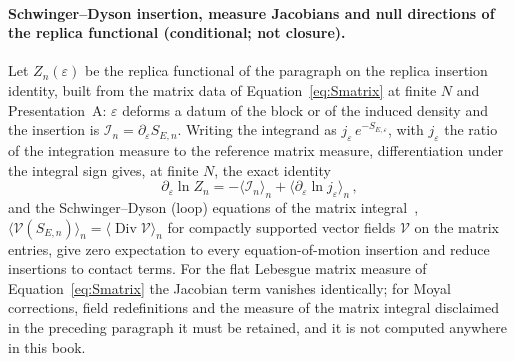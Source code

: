 \paragraph{Schwinger--Dyson insertion, measure Jacobians and null directions of the replica functional (conditional; not closure).}
Let \(Z_n(\varepsilon)\) be the replica functional of the paragraph on the replica insertion identity, built from the matrix data of Equation~\eqref{eq:Smatrix} at finite \(N\) and Presentation~A: \(\varepsilon\) deforms a datum of the block or of the induced density and the insertion is \(\mathcal I_n=\partial_\varepsilon S_{E,n}\). Writing the integrand as \(j_\varepsilon\,e^{-S_{E,\varepsilon}}\), with \(j_\varepsilon\) the ratio of the integration measure to the reference matrix measure, differentiation under the integral sign gives, at finite \(N\), the exact identity
\[
  \partial_\varepsilon\ln Z_n=-\langle\mathcal I_n\rangle_n+\langle\partial_\varepsilon\ln j_\varepsilon\rangle_n\,,
\]
and the Schwinger--Dyson (loop) equations of the matrix integral~\cite{EynardOrantin2009}, \(\langle\mathcal V(S_{E,n})\rangle_n=\langle\operatorname{Div}\mathcal V\rangle_n\) for compactly supported vector fields \(\mathcal V\) on the matrix entries, give zero expectation to every equation-of-motion insertion and reduce insertions to contact terms. For the flat Lebesgue matrix measure of Equation~\eqref{eq:Smatrix} the Jacobian term vanishes identically; for Moyal corrections, field redefinitions and the measure of the matrix integral disclaimed in the preceding paragraph it must be retained, and it is not computed anywhere in this book.

